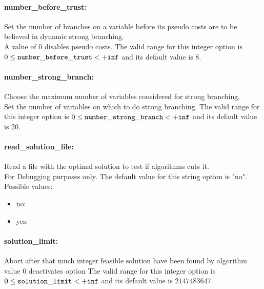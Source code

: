 \paragraph{\bf number\_before\_trust:}\label{sec:number_before_trust} Set the number of branches on a variable before its pseudo costs are to be believed in dynamic strong branching. $\;$ \\
 A value of 0 disables pseudo costs. The valid range for this integer option is
$0 \le {\tt number\_before\_trust } <  {\tt +inf}$
and its default value is $8$.


\paragraph{\bf number\_strong\_branch:}\label{sec:number_strong_branch} Choose the maximum number of variables considered for strong branching. $\;$ \\
 Set the number of variables on which to do strong
branching. The valid range for this integer option is
$0 \le {\tt number\_strong\_branch } <  {\tt +inf}$
and its default value is $20$.


\paragraph{\bf read\_solution\_file:}\label{sec:read_solution_file} Read a file with the optimal solution to test if algorithms cuts it. $\;$ \\
 For Debugging purposes only.
The default value for this string option is "no".
\\ 
Possible values:
\begin{itemize}
   \item no: 
   \item yes: 
\end{itemize}

\paragraph{\bf solution\_limit:}\label{sec:solution_limit} Abort after that much integer feasible solution have been found by algorithm $\;$ \\
 value 0 deactivates option The valid range for this integer option is
$0 \le {\tt solution\_limit } <  {\tt +inf}$
and its default value is $2147483647$.


